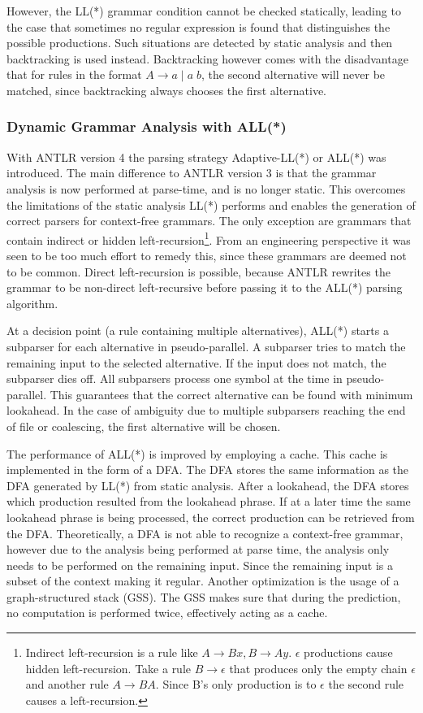 However, the LL(*) grammar condition cannot be checked statically, leading to the case that sometimes no regular expression is found that distinguishes the possible productions. Such situations are detected by static analysis and then backtracking is used instead. Backtracking however comes with the disadvantage that for rules in the format $A \rightarrow a\;|\;a\;b$, the second alternative will never be matched, since backtracking always chooses the first alternative. 

\subsubsection{Dynamic Grammar Analysis with ALL(*)}

With ANTLR version 4 the parsing strategy Adaptive-LL(*) or ALL(*) was introduced. The main difference to ANTLR version 3 is that the grammar analysis is now performed at parse-time, and is no longer static. This overcomes the limitations of the static analysis LL(*) performs and enables the generation of correct parsers for context-free grammars. The only exception are grammars that contain indirect or hidden left-recursion\footnote{Indirect left-recursion is a rule like $A \rightarrow Bx, B \rightarrow Ay$. $\epsilon$ productions cause hidden left-recursion. Take a rule $B \rightarrow \epsilon$ that produces only the empty chain $\epsilon$ and another rule $A \rightarrow BA$. Since B's only production is to $\epsilon$ the second rule causes a left-recursion. }. From an engineering perspective it was seen to be too much effort to remedy this, since these grammars are deemed not to be common. Direct left-recursion is possible, because ANTLR rewrites the grammar to be non-direct left-recursive before passing it to the ALL(*) parsing algorithm. 

At a decision point (a rule containing multiple alternatives), ALL(*) starts a subparser for each alternative in pseudo-parallel. A subparser tries to match the remaining input to the selected alternative. If the input does not match, the subparser dies off. All subparsers process one symbol at the time in pseudo-parallel. This guarantees that the correct alternative can be found with minimum lookahead. In the case of ambiguity due to multiple subparsers reaching the end of file or coalescing, the first alternative will be chosen. 

The performance of ALL(*) is improved by employing a cache. This cache is implemented in the form of a DFA. The DFA stores the same information as the DFA generated by LL(*) from static analysis. After a lookahead, the DFA stores which production resulted from the lookahead phrase. If at a later time the same lookahead phrase is being processed, the correct production can be retrieved from the DFA. Theoretically, a DFA is not able to recognize a context-free grammar, however due to the analysis being performed at parse time, the analysis only needs to be performed on the remaining input. Since the remaining input is a subset of the context making it regular. Another optimization is the usage of a graph-structured stack (GSS). The GSS makes sure that during the prediction, no computation is performed twice, effectively acting as a cache. 


